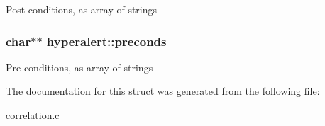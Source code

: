 \label{structhyperalert_a69e0ed6e53e6fe23d3de2ec1f5d13863}
Post-\/conditions, as array of strings \hypertarget{structhyperalert_afa2862b9a574be52e5dc4a4cc0178d66}{
\subsubsection[{preconds}]{\setlength{\rightskip}{0pt plus 5cm}char$\ast$$\ast$ {\bf hyperalert::preconds}}}
\label{structhyperalert_afa2862b9a574be52e5dc4a4cc0178d66}
Pre-\/conditions, as array of strings 

The documentation for this struct was generated from the following file:\begin{DoxyCompactItemize}
\item 
\hyperlink{correlation_8c}{correlation.c}\end{DoxyCompactItemize}

